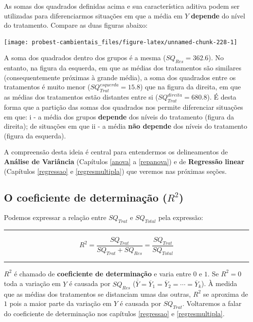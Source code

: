 \documentclass[
]{book}
\begin{document}
As somas dos quadrados definidas acima e sua característica aditiva podem ser utilizadas para diferenciarmos situações em que a média em \(Y\) \textbf{depende} do nível do tratamento. Compare as duas figuras abaixo:

\begin{center}\texttt{[image: probest-cambientais\_files/figure-latex/unnamed-chunk-228-1]} \end{center}

A soma dos quadrados dentro dos grupos é a mesma (\(SQ_{Res} = 362.6\)). No entanto, na figura da esquerda, em que as médias dos tratamentos são similares (consequentemente próximas à grande média), a soma dos quadrados entre os tratamentos é muito menor (\(SQ_{Trat}^{esquerda} = 15.8\)) que na figura da direita, em que as médias dos tratamentos estão distantes entre si (\(SQ_{Trat}^{direita} = 680.8\)). É desta forma que a partição das somas dos quadrados nos permite diferenciar situações em que: i - a média dos grupos \textbf{depende} dos níveis do tratamento (figura da direita); de situações em que ii - a média \textbf{não depende} dos níveis do tratamento (figura da esquerda).

A compreensão desta ideia é central para entendermos os delineamentos de \textbf{Análise de Variância} (Capítulos \ref{anova} a \ref{repanova}) e de \textbf{Regressão linear} (Capítulos \ref{regressao} e \ref{regresmultipla}) que veremos nas próximas seções.

\hypertarget{o-coeficiente-de-determinauxe7uxe3o-r2}{%
\subsection{\texorpdfstring{O coeficiente de determinação (\(R^2\))}{O coeficiente de determinação (R\^{}2)}}\label{o-coeficiente-de-determinauxe7uxe3o-r2}}

Podemos expressar a relação entre \(SQ_{Trat}\) e \(SQ_{Total}\) pela expressão:

\begin{center}\rule{0.5\linewidth}{0.5pt}\end{center}

\[R^2 = \frac{SQ_{Trat}}{SQ_{Trat} + SQ_{Res}} = \frac{SQ_{Trat}}{SQ_{Total}}\]

\begin{center}\rule{0.5\linewidth}{0.5pt}\end{center}

\(R^2\) é chamado de \textbf{coeficiente de determinação} e varia entre \(0\) e \(1\). Se \(R^2 = 0\) toda a variação em \(Y\) é causada por \(SQ_{Res}\) (\(\overline{\overline{Y}} = \overline{Y}_1 = \overline{Y}_2 = \cdots = \overline{Y}_k\)). À medida que as médias dos tratamentos se distanciam umas das outras, \(R^2\) se aproxima de \(1\) pois a maior parte da variação em \(Y\) é causada por \(SQ_{Trat}\). Voltaremos a falar do coeficiente de determinação nos capítulos \ref{regressao} e \ref{regresmultipla}.
\end{document}
